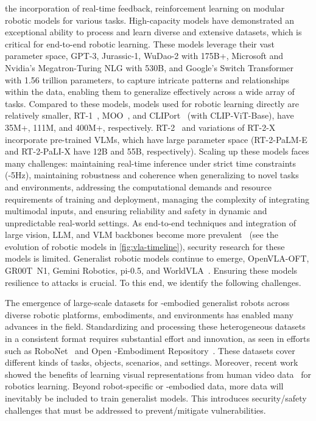  the incorporation of real-time feedback, reinforcement learning on modular robotic models for various tasks.
High-capacity models have demonstrated an exceptional ability to process and learn diverse and extensive datasets, which is critical for end-to-end robotic learning. 
These models leverage their vast parameter space, \eg GPT-3, Jurassic-1, WuDao-2 with 175B+, Microsoft and Nvidia's Megatron-Turing NLG with 530B, and Google's Switch Transformer with 1.56 trillion parameters, to capture intricate patterns and relationships within the data, enabling them to generalize effectively across a wide array of tasks. 
Compared to these models, models used for robotic learning directly are relatively smaller, \eg RT-1~\cite{rt-1}, MOO~\cite{stone2023open}, and CLIPort~\cite{shridhar2022cliport} (with CLIP-ViT-Base), have 35M+, 111M, and 400M+, respectively. RT-2~\cite{rt-2} and variations of RT-2-X~\cite{9} incorporate pre-trained VLMs, which have large parameter space (\eg RT-2-PaLM-E and RT-2-PaLI-X have 12B and 55B, respectively).
Scaling up these models faces many challenges: 
 maintaining real-time inference under strict time constraints (-5Hz), 
 maintaining robustness and coherence when generalizing to novel tasks and environments, 
 addressing the computational demands and resource requirements of training and deployment, 
 managing the complexity of integrating multimodal inputs, and 
 ensuring reliability and safety in dynamic and unpredictable real-world settings.
As end-to-end techniques and integration of large vision, LLM, and VLM backbones become more prevalent~\cite{9} (see the evolution of robotic models in \autoref{fig:vla-timeline}), security research for these models is limited. Generalist robotic models continue to emerge, \eg OpenVLA-OFT, {GR00T}~N1, Gemini Robotics, pi-0.5, and WorldVLA~\cite{qu2025spatialvla,openvla_oft,gr00tn1,geminirobotics2025,pi05_2025,cen2025worldvla,cheang2024gr2}. Ensuring these models resilience to attacks is crucial.
To this end, we identify the following challenges.


The emergence of large-scale datasets for {\xo}-embodied generalist robots across diverse robotic platforms, embodiments, and environments has enabled many advances in the field.
Standardizing and processing these heterogeneous datasets in a consistent format requires substantial effort and innovation, as seen in efforts such as RoboNet~\cite{dasari2020robonet} and Open {\xo}-Embodiment Repository~\cite{9}. 
These datasets cover different kinds of tasks, objects, scenarios, and settings.
Moreover, recent work showed the benefits of learning visual representations from human video data~\cite{nair2022r3m,xiao2022masked,radosavovic2022,majumdar2024we,karamcheti2023language,mu2023ec2,bahl2023affordances} for robotics learning. 
Beyond robot-specific or {\xo}-embodied data, more data will inevitably be included to train generalist models.
This introduces security/safety challenges that must be addressed to prevent/mitigate vulnerabilities.


